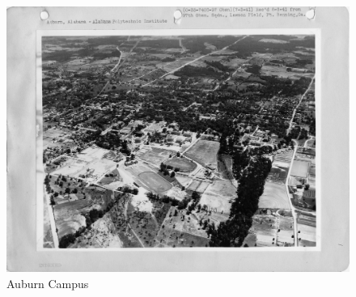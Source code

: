 \documentclass{article}   %
\begin{document}
  \iffalse
  \begin{figure}[h!]
    \includegraphics[width=\linewidth]{auburn_01.jpg}
    \caption{Auburn Campus}
    \label{fig:au01}
  \end{figure}
\end{document}
